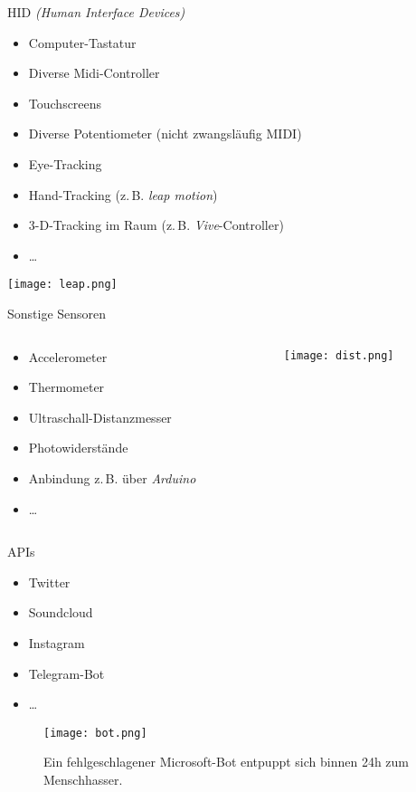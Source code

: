 \begin{frame}{HID \emph{(Human Interface Devices)}}
	\begin{itemize}
		\item Computer-Tastatur
		\item Diverse Midi-Controller
		\item Touchscreens
		\item Diverse Potentiometer (nicht zwangsläufig MIDI)
		\item Eye-Tracking
		\item Hand-Tracking (z.\,B. \emph{leap motion})
		\item 3-D-Tracking im Raum (z.\,B. \emph{Vive}-Controller)
		\item \dots{}
	\end{itemize}
\begin{center}
\texttt{[image: leap.png]}
\end{center}

\end{frame}


\begin{frame}{Sonstige Sensoren}

\begin{columns}
	\begin{column}{0.5\textwidth}
		\begin{itemize}
		\item Accelerometer
		\item Thermometer
		\item Ultraschall-Distanzmesser
		\item Photowiderstände
		\item Anbindung z.\,B. über \emph{Arduino}
		\item \dots{}
		\end{itemize}
	\end{column}

	\begin{column}{0.5\textwidth}
		\texttt{[image: dist.png]}
	\end{column}

\end{columns}

\end{frame}


\begin{frame}{APIs}
\begin{itemize}
	\item Twitter
	\item Soundcloud
	\item Instagram
	\item Telegram-Bot
	\item \dots{}
\end{itemize}

\begin{center}
\begin{figure}
\texttt{[image: bot.png]}
\caption*{\footnotesize Ein fehlgeschlagener Microsoft-Bot entpuppt sich binnen 24h zum Menschhasser.}
\end{figure}
\end{center}

\end{frame}


